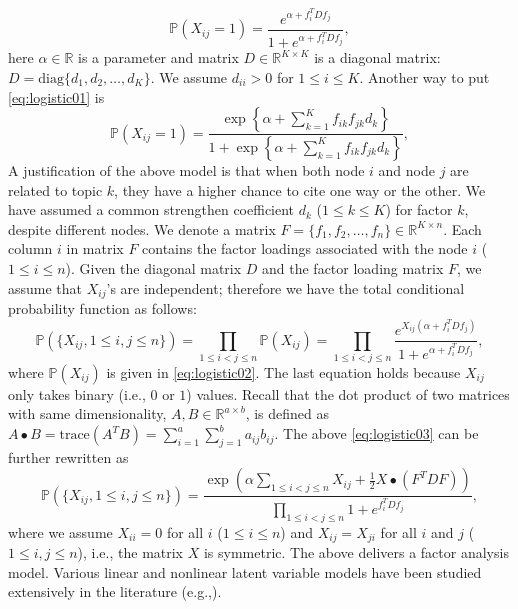 \documentclass{article}
\begin{document}
\begin{equation}
\label{eq:logistic01}
\mathbb{P}(X_{ij}=1) = \frac{e^{\alpha + f_i^T D f_j }}{1 + e^{\alpha + f_i^T D f_j }},
\end{equation}
here $\alpha \in \mathbb{R}$ is a parameter and matrix $D \in \mathbb{R}^{K \times K}$ is a diagonal matrix: $D = \mbox{diag}\{d_{1},d_{2},\ldots,d_{K}\}$. We assume $d_{ii} > 0$ for $1 \le i \le K$.
Another way to put \eqref{eq:logistic01} is
\begin{equation}
\label{eq:logistic02}
\mathbb{P}(X_{ij}=1) = \frac{\exp\left\{\alpha + \sum_{k=1}^K f_{ik}f_{jk}d_{k} \right\}}{1 + \exp\left\{\alpha + \sum_{k=1}^K f_{ik}f_{jk}d_{k} \right\}},
\end{equation}
A justification of the above model is that when both node $i$ and node $j$ are related to topic $k$, they have a higher chance to cite one way or the other. We have assumed a common strengthen coefficient $d_k$ ($1\le k \le K$) for factor $k$, despite different nodes. We denote a matrix $F = \{f_1, f_2, \ldots, f_n\} \in \mathbb{R}^{K \times n}$. Each column $i$ in matrix $F$ contains the factor loadings associated with the node $i$ ($1\le i \le n$). Given the diagonal matrix $D$ and the factor loading matrix $F$, we assume that $X_{ij}$'s are independent; therefore we have the total conditional probability function as follows:
\begin{equation}
\label{eq:logistic03}
\mathbb{P}(\{X_{ij}, 1\le i,j \le n\})
= \prod_{1\le i<j \le n} \mathbb{P}(X_{ij})
= \prod_{1\le i<j \le n}  \frac{e^{X_{ij}(\alpha + f_i^T D f_j) }}{1 + e^{\alpha + f_i^T D f_j }},
\end{equation}
where $\mathbb{P}(X_{ij})$ is given in \eqref{eq:logistic02}.
The last equation holds because $X_{ij}$ only takes binary (i.e., $0$ or $1$) values.
Recall that the dot product of two matrices with same dimensionality, $A,B\in \mathbb{R}^{a \times b}$, is defined as $A\bullet B=\mbox{trace}(A^T B) = \sum_{i=1}^a\sum_{j=1}^b a_{ij}b_{ij}$.
The above \eqref{eq:logistic03} can be further rewritten as
\begin{equation}
\label{eq:logistic04}
\mathbb{P}(\{X_{ij}, 1\le i,j \le n\})
= \frac{\exp(\alpha \sum_{1\le i< j\le n}X_{ij} +\frac{1}{2} X \bullet (F^T D F))}{\prod_{1\le i<j \le n}  1 + e^{f_i^T D f_j }},
\end{equation}
where we assume $X_{ii}=0$ for all $i$ ($1\le i \le n$) and $X_{ij} = X_{ji}$ for all $i$ and $j$ ($1\le i,j \le n$), i.e., the matrix $X$ is symmetric.
The above delivers a factor analysis model. Various linear and nonlinear latent variable models have been studied extensively in the literature (e.g.,\cite{joreskog1969general, mcdonald2014factor,lord2008statistical, rasch1980probabilistic, harman1960modern, joreskog1970general}).
\end{document}
